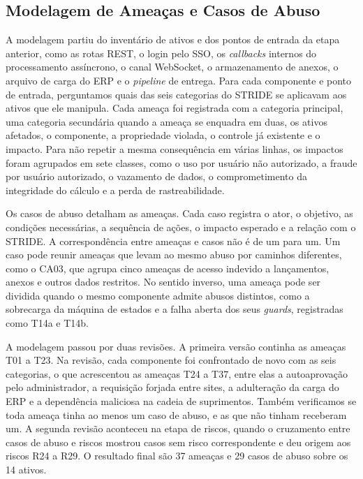 \documentclass[conference]{IEEEtran}
\begin{document}
\subsection{Modelagem de Ameaças e Casos de Abuso}
\label{subsec:met-ameacas}

A modelagem partiu do inventário de ativos e dos pontos de entrada da etapa anterior, como as rotas REST, o login pelo SSO, os \textit{callbacks} internos do processamento assíncrono, o canal WebSocket, o armazenamento de anexos, o arquivo de carga do ERP e o \textit{pipeline} de entrega. Para cada componente e ponto de entrada, perguntamos quais das seis categorias do STRIDE se aplicavam aos ativos que ele manipula. Cada ameaça foi registrada com a categoria principal, uma categoria secundária quando a ameaça se enquadra em duas, os ativos afetados, o componente, a propriedade violada, o controle já existente e o impacto. Para não repetir a mesma consequência em várias linhas, os impactos foram agrupados em sete classes, como o uso por usuário não autorizado, a fraude por usuário autorizado, o vazamento de dados, o comprometimento da integridade do cálculo e a perda de rastreabilidade.

Os casos de abuso detalham as ameaças. Cada caso registra o ator, o objetivo, as condições necessárias, a sequência de ações, o impacto esperado e a relação com o STRIDE. A correspondência entre ameaças e casos não é de um para um. Um caso pode reunir ameaças que levam ao mesmo abuso por caminhos diferentes, como o CA03, que agrupa cinco ameaças de acesso indevido a lançamentos, anexos e outros dados restritos. No sentido inverso, uma ameaça pode ser dividida quando o mesmo componente admite abusos distintos, como a sobrecarga da máquina de estados e a falha aberta dos seus \textit{guards}, registradas como T14a e T14b.

A modelagem passou por duas revisões. A primeira versão continha as ameaças T01 a T23. Na revisão, cada componente foi confrontado de novo com as seis categorias, o que acrescentou as ameaças T24 a T37, entre elas a autoaprovação pelo administrador, a requisição forjada entre sites, a adulteração da carga do ERP e a dependência maliciosa na cadeia de suprimentos. Também verificamos se toda ameaça tinha ao menos um caso de abuso, e as que não tinham receberam um. A segunda revisão aconteceu na etapa de riscos, quando o cruzamento entre casos de abuso e riscos mostrou casos sem risco correspondente e deu origem aos riscos R24 a R29. O resultado final são 37 ameaças e 29 casos de abuso sobre os 14 ativos.
\end{document}
